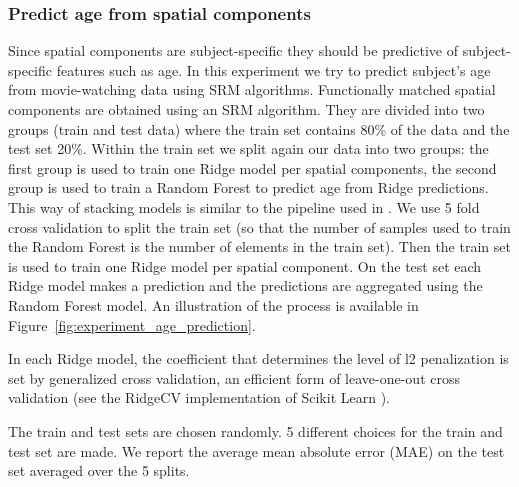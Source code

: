 \subsubsection{Predict age from spatial components}
Since spatial components are subject-specific they should be predictive of subject-specific features such as age.
%
In this experiment we try to predict subject's age from movie-watching data using SRM algorithms.
%
Functionally matched spatial components are obtained using an SRM algorithm.
%
They are divided into two groups (train and test data) where the train set contains 80\% of the data and the test set 20\%.
%
Within the train set we split again our data into two groups: the first group is used to train one Ridge model per spatial components, the second group is used to train a Random Forest to predict age from Ridge predictions. This way of stacking models is similar to the pipeline used in \cite{rahim2017joint}.
%
We use 5 fold cross validation to split the train set (so that the number of samples used to train the Random Forest is the number of elements in the train set).
%
Then the train set is used to train one Ridge model per spatial component.
%
On the test set each Ridge model makes a prediction and the predictions are aggregated using the Random Forest model.
%
An illustration of the process is available in Figure~\ref{fig:experiment_age_prediction}. 

In each Ridge model, the coefficient that determines the level of l2 penalization is set by generalized cross validation, an efficient form of leave-one-out cross validation (see the RidgeCV implementation of Scikit Learn \cite{pedregosa2011scikit}).

The train and test sets are chosen randomly. 5 different choices for the train and test set are made. We report the average mean absolute error (MAE) on the test set averaged over the 5 splits.

